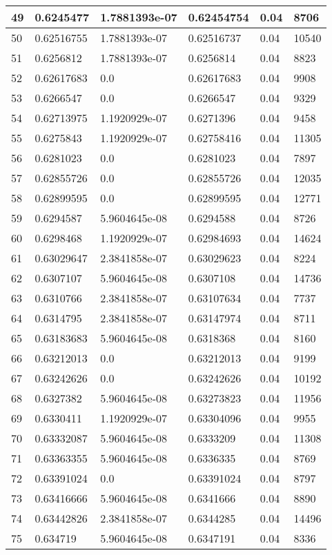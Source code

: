 \begin{longtable}{|l|l|l|l|l|l|}
49 & 0.6245477 & 1.7881393e-07 & 0.62454754 & 0.04 & 8706 \\ \hline 
50 & 0.62516755 & 1.7881393e-07 & 0.62516737 & 0.04 & 10540 \\ \hline 
51 & 0.6256812 & 1.7881393e-07 & 0.6256814 & 0.04 & 8823 \\ \hline 
52 & 0.62617683 & 0.0 & 0.62617683 & 0.04 & 9908 \\ \hline 
53 & 0.6266547 & 0.0 & 0.6266547 & 0.04 & 9329 \\ \hline 
54 & 0.62713975 & 1.1920929e-07 & 0.6271396 & 0.04 & 9458 \\ \hline 
55 & 0.6275843 & 1.1920929e-07 & 0.62758416 & 0.04 & 11305 \\ \hline 
56 & 0.6281023 & 0.0 & 0.6281023 & 0.04 & 7897 \\ \hline 
57 & 0.62855726 & 0.0 & 0.62855726 & 0.04 & 12035 \\ \hline 
58 & 0.62899595 & 0.0 & 0.62899595 & 0.04 & 12771 \\ \hline 
59 & 0.6294587 & 5.9604645e-08 & 0.6294588 & 0.04 & 8726 \\ \hline 
60 & 0.6298468 & 1.1920929e-07 & 0.62984693 & 0.04 & 14624 \\ \hline 
61 & 0.63029647 & 2.3841858e-07 & 0.63029623 & 0.04 & 8224 \\ \hline 
62 & 0.6307107 & 5.9604645e-08 & 0.6307108 & 0.04 & 14736 \\ \hline 
63 & 0.6310766 & 2.3841858e-07 & 0.63107634 & 0.04 & 7737 \\ \hline 
64 & 0.6314795 & 2.3841858e-07 & 0.63147974 & 0.04 & 8711 \\ \hline 
65 & 0.63183683 & 5.9604645e-08 & 0.6318368 & 0.04 & 8160 \\ \hline 
66 & 0.63212013 & 0.0 & 0.63212013 & 0.04 & 9199 \\ \hline 
67 & 0.63242626 & 0.0 & 0.63242626 & 0.04 & 10192 \\ \hline 
68 & 0.6327382 & 5.9604645e-08 & 0.63273823 & 0.04 & 11956 \\ \hline 
69 & 0.6330411 & 1.1920929e-07 & 0.63304096 & 0.04 & 9955 \\ \hline 
70 & 0.63332087 & 5.9604645e-08 & 0.6333209 & 0.04 & 11308 \\ \hline 
71 & 0.63363355 & 5.9604645e-08 & 0.6336335 & 0.04 & 8769 \\ \hline 
72 & 0.63391024 & 0.0 & 0.63391024 & 0.04 & 8797 \\ \hline 
73 & 0.63416666 & 5.9604645e-08 & 0.6341666 & 0.04 & 8890 \\ \hline 
74 & 0.63442826 & 2.3841858e-07 & 0.6344285 & 0.04 & 14496 \\ \hline 
75 & 0.634719 & 5.9604645e-08 & 0.6347191 & 0.04 & 8336 \\ \hline 
\end{longtable}
